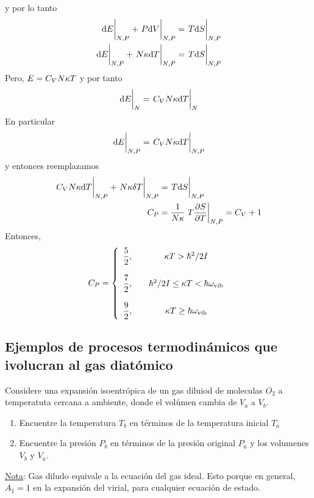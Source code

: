 y por lo tanto
\begin{align}
  \eval{\dd E}_{N,P}+\eval{P\dd V}_{N,P}&=\eval{T\dd S}_{N,P}\\
  \eval{\dd E}_{N,P}+\eval{N\k \dd T}_{N,P}&=\eval{T\dd S}_{N,P}
\end{align}
Pero, $E=C_VN\kappa T$ y por tanto
\begin{equation}
  \eval{\dd E}_{N}=\eval{C_VN\k \dd T}_N
\end{equation}
En particular
\begin{equation}
  \eval{\dd E}_{N,P}=\eval{C_VN\k \dd T}_{N,P}
\end{equation}
y entonces reemplazamos
\begin{align}
  \eval{C_VN\k\dd T}_{N,P}+\eval{N\k\d T}_{N,P}&=\eval{T\dd S}_{N,P}\\
  C_P&=\frac{1}{N\k }\eval{T\pdv{S}{T}}_{N,P}=C_V+1
\end{align}
Entonces,
\begin{equation}
  C_P=\left\{\begin{array}{ccc}
  	\dfrac{5}{2},&& \kappa T>\hbar^2/2I\\\\
  	\dfrac{7}{2},& &\hbar^2/2I\leq \kappa T<\hbar\omega_{\rm vib}\\\\
  	\dfrac{9}{2},&& \kappa T\geq \hbar\omega_{\rm vib}
  \end{array}\right.
\end{equation}

\subsection{Ejemplos de procesos termodinámicos que ivolucran al gas diatómico}
\begin{ej}
	Considere una expansión isoentrópica de un gas diluiod de moleculas $O_2$ a temperatuta cercana a ambiente, donde el volúmen cambia de $V_a$ a $V_b$.
	\begin{enumerate}
		\item Encuentre la temperatura $T_b$ en términos de la temperatura inicial $T_a$
		\item Encuentre la presión $P_b$ en términos de la presión original $P_a$ y los volumenes $V_b$ y $V_a$.
	\end{enumerate}
	
	\underline{Nota}: Gas diludo equivale a la ecuación del gas ideal. Esto porque en general, $A_1=1$ en la expansión del virial, para cualquier ecuación de estado.
\end{ej}

